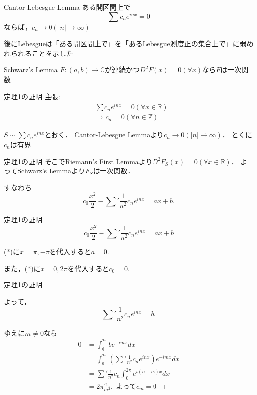 \documentclass[dvipdfmx,17pt]{beamer}
\theoremstyle{plain}
\newcommand{\Z}{\mathbb{Z}}
\newcommand{\R}{\mathbb{R}}
\newcommand{\C}{\mathbb{C}}
\begin{document}

\begin{frame}{Cantor-Lebesgue Lemma}
ある開区間上で
\[\sum c_n e^{inx} = 0\]
ならば，$c_n \to 0 (|n| \to \infty)$

\vspace{1cm}
{\footnotesize 後にLebesgueは「ある開区間上で」を「あるLebesgue測度正の集合上で」に弱めれられることを示した}
\end{frame}

\begin{frame}{Schwarz's Lemma}
$F: (a, b) \to \C$が連続かつ$D^2F(x) = 0 (\forall x)$なら$F$は一次関数
\end{frame}

\begin{frame}{定理1の証明}
主張:
\begin{align*}
& \sum c_n e^{inx} = 0 (\forall x \in \R) \\
& \Rightarrow c_n = 0 (\forall n \in \Z)
\end{align*}

$S \sim \sum c_n e^{inx}$とおく．
Cantor-Lebesgue Lemmaより$c_n \to 0 (|n| \to \infty)$．
とくに$c_n$は有界
\end{frame}

\begin{frame}{定理1の証明}
そこでRiemann's First Lemmaより$D^2 F_S(x) = 0 (\forall x\in\R)$．
よってSchwarz's Lemmaより$F_S$は一次関数．

すなわち
\[c_0 \frac{x^2}{2} - {\sum}' \frac{1}{n^2} c_n e^{inx} = ax + b.\]
\end{frame}

\begin{frame}{定理1の証明}
\[c_0 \frac{x^2}{2} - {\sum}' \frac{1}{n^2} c_n e^{inx} = ax + b \tag{*}\]

(*)に$x=\pi, -\pi$を代入すると$a = 0.$

また，(*)に$x=0, 2\pi$を代入すると$c_0 = 0.$
\end{frame}

\begin{frame}{定理1の証明}

{\small
よって，
\[{\sum}' \frac{1}{n^2} c_n e^{inx} = b.\]

ゆえに$m \ne 0$なら
\begin{align*}
0 &= \int_0^{2\pi} b e^{-imx} dx \\
&= \int_0^{2\pi} ({\sum}' \frac{1}{n^2} c_n e^{inx}) e^{-imx} dx \\
&= {\sum}' \frac{1}{n^2} c_n \int_0^{2\pi} e^{i(n - m)x} dx \\
&= 2\pi \frac{c_m}{m^2}. \ \ \text{よって} c_m = 0 \ \ \text{□}
\end{align*}
}
\end{frame}
\end{document}

